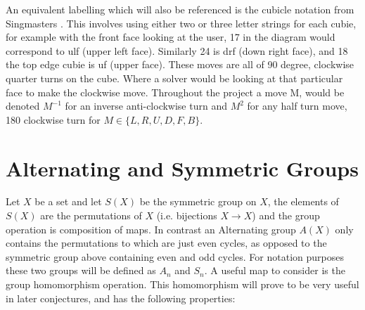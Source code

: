 \documentclass{article}
\newcounter{prop}[section]\setcounter{prop}{0}
\newcounter{lem}[section]\setcounter{lem}{0}
\begin{document}
An equivalent labelling which will also be referenced is the cubicle notation from Singmasters \cite{Magic}. This involves using either two or three letter strings for each cubie, for example with the front face looking at the user, 17 in the diagram would correspond to ulf (upper left face). Similarly 24 is drf (down right face), and 18 the top edge cubie is uf (upper face).
These moves are all of 90 degree, clockwise quarter turns on the cube. Where a solver would be looking at that particular face to make the clockwise move. Throughout the project a move M, would be denoted $M^{-1}$ for an inverse anti-clockwise turn and $M^{2}$ for any half turn move, 180 clockwise turn for $M \in \{L,R,U,D,F,B\}$.

\newpage
\section{Alternating and Symmetric Groups}
Let $X$ be a set and let $S(X)$ be the symmetric group on $X$, the elements of $S(X)$ are the permutations of $X$ (i.e. bijections $X\rightarrow X$) and the group operation is
composition of maps.
In contrast an Alternating group $A(X)$ only contains the permutations to which are just even cycles, as opposed to the symmetric group above containing even and odd cycles. For notation purposes these two groups will be defined as $A_{n}$ and $S_{n}$. \newline A useful map to consider is the group homomorphism operation. This homomorphism will prove to be very useful in later conjectures, and has the following properties:
\end{document}
